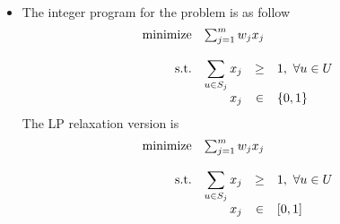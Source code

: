 \documentclass[12pt]{article}
\newenvironment{solution}[2][Solution]{\begin{trivlist}
\item[\hskip \labelsep {\bfseries #1}\hskip \labelsep {\bfseries #2.}]}{\end{trivlist}}
\begin{document}
\begin{solution}{4}
    ~

    \begin{itemize}
        \item The integer program for the problem is as follow
              \begin{equation*}
                  \begin{array}{rrclcl}
                      \displaystyle \textrm{minimize} & \multicolumn{3}{l}{\sum_{j=1}^m w_jx_j}                              \\
                      \\
                      \textrm{s.t.}                   & \displaystyle \sum_{u\in S_j}x_j        & \ge & 1, ~ \forall u \in U \\
                                                      & x_j                                     & \in & \{0, 1\}             \\
                  \end{array}
              \end{equation*}
              The LP relaxation version is
              \begin{equation*}
                \begin{array}{rrclcl}
                    \displaystyle \textrm{minimize} & \multicolumn{3}{l}{\sum_{j=1}^m w_jx_j}                              \\
                    \\
                    \textrm{s.t.}                   & \displaystyle \sum_{u\in S_j}x_j        & \ge & 1, ~ \forall u \in U \\
                                                    & x_j                                     & \in & [0, 1]
                                                    

\end{array}
\end{equation*}
\end{itemize}
\end{solution}
\end{document}
